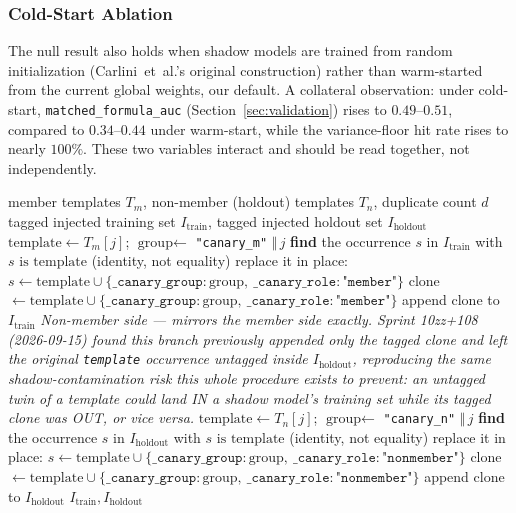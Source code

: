 \subsubsection{Cold-Start Ablation}
\label{sec:framework-coldstart}

The null result also holds when shadow models are trained from random
initialization (Carlini~et~al.'s original construction) rather than
warm-started from the current global weights, our default. A
collateral observation: under cold-start,
\texttt{matched\_formula\_auc} (Section~\ref{sec:validation}) rises to
$0.49$--$0.51$, compared to $0.34$--$0.44$ under warm-start, while the
variance-floor hit rate rises to nearly $100\%$. These two variables
interact and should be read together, not independently.

\begin{algorithm}[t]
\caption{Canary injection with member/non-member tagging (both sides required)}
\label{alg:inject-canaries}
\begin{algorithmic}[1]
\REQUIRE member templates $T_m$, non-member (holdout) templates $T_n$, duplicate count $d$
\ENSURE tagged injected training set $I_{\text{train}}$, tagged injected holdout set $I_{\text{holdout}}$
  \STATE $\text{template} \gets T_m[j]$; \quad $\text{group} \gets$ \texttt{"canary\_m"} $\Vert\, j$
  \STATE \textbf{find} the occurrence $s$ in $I_{\text{train}}$ with $s \text{ is } \text{template}$ (identity, not equality)
  \STATE replace it in place: $s \gets \text{template} \cup \{\texttt{\_canary\_group}: \text{group},\ \texttt{\_canary\_role}: \texttt{"member"}\}$
    \STATE clone $\gets \text{template} \cup \{\texttt{\_canary\_group}: \text{group},\ \texttt{\_canary\_role}: \texttt{"member"}\}$
    \STATE append clone to $I_{\text{train}}$
  \ENDFOR
\ENDFOR
\STATE \textit{Non-member side --- mirrors the member side exactly. Sprint 10zz+108 (2026-09-15) found this branch previously appended only the tagged clone and left the original \texttt{template} occurrence untagged inside $I_{\text{holdout}}$, reproducing the same shadow-contamination risk this whole procedure exists to prevent: an untagged twin of a template could land IN a shadow model's training set while its tagged clone was OUT, or vice versa.}
  \STATE $\text{template} \gets T_n[j]$; \quad $\text{group} \gets$ \texttt{"canary\_n"} $\Vert\, j$
  \STATE \textbf{find} the occurrence $s$ in $I_{\text{holdout}}$ with $s \text{ is } \text{template}$ (identity, not equality)
  \STATE replace it in place: $s \gets \text{template} \cup \{\texttt{\_canary\_group}: \text{group},\ \texttt{\_canary\_role}: \texttt{"nonmember"}\}$
  \STATE clone $\gets \text{template} \cup \{\texttt{\_canary\_group}: \text{group},\ \texttt{\_canary\_role}: \texttt{"nonmember"}\}$
  \STATE append clone to $I_{\text{holdout}}$
\ENDFOR
\STATE \RETURN $I_{\text{train}}, I_{\text{holdout}}$
\end{algorithmic}
\end{algorithm}


